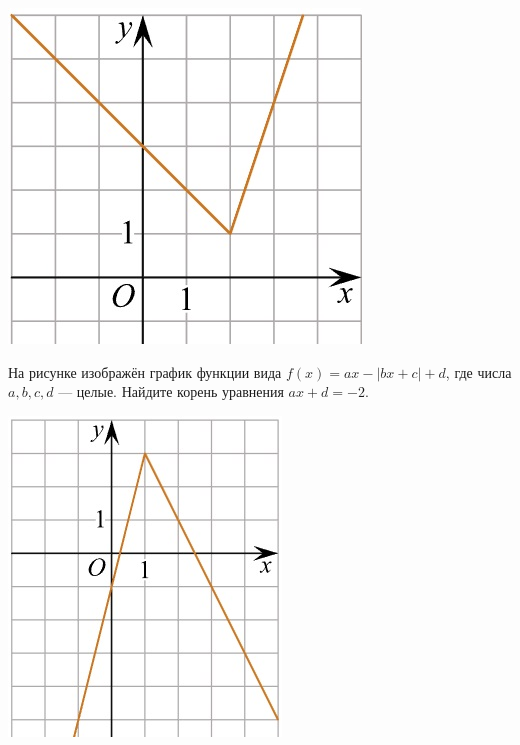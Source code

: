 \begin{class}[number=6]
\begin{minipage}[c]{0.1\textwidth}
			\includegraphics[align=t, width=\textwidth]{pics/G101M4C5-7.jpg}
		\end{minipage}
		\item
		\begin{minipage}[t]{0.43\textwidth}
			На рисунке изображён график функции вида \(f(x)=ax-|bx+c|+d\), где числа \(a, b, c, d\) --- целые. Найдите корень уравнения \(ax+d=-2\).
		\end{minipage}
		\begin{minipage}[c]{0.1\textwidth}
			\includegraphics[align=t, width=\textwidth]{pics/G101M4C6-8.jpg}

\end{minipage}
\end{class}
